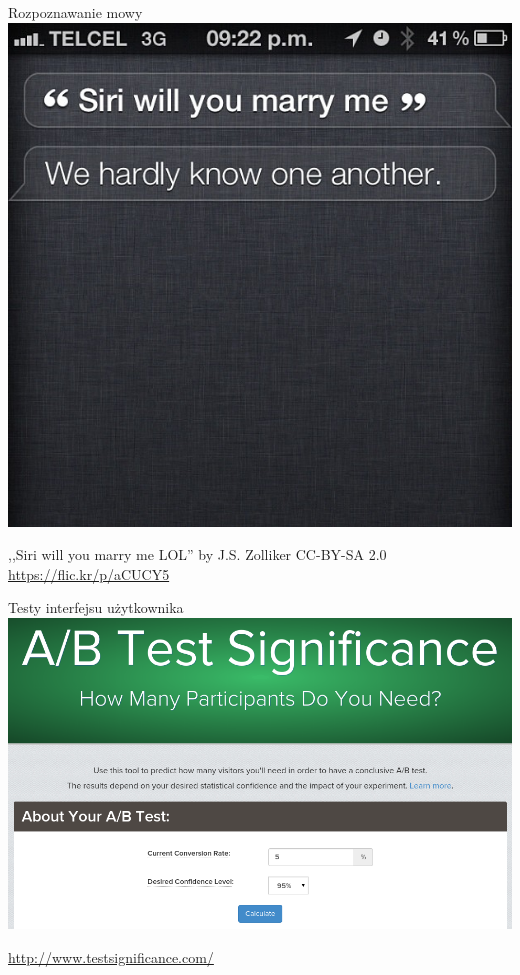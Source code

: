 \documentclass{beamer}
\begin{document}
\begin{frame}{Rozpoznawanie mowy}
\centering\includegraphics[width=.8\textwidth,bb=0 50mm 220mm 220mm,clip]{siri.jpg}

{\tiny ,,Siri will you marry me LOL'' by J.S. Zolliker CC-BY-SA 2.0 \url{https://flic.kr/p/aCUCY5}}
\end{frame}
\begin{frame}{Testy interfejsu użytkownika}
\centering\includegraphics[width=.9\textwidth]{ab.png}

{\tiny \url{http://www.testsignificance.com/}}
\end{frame}
\end{document}
